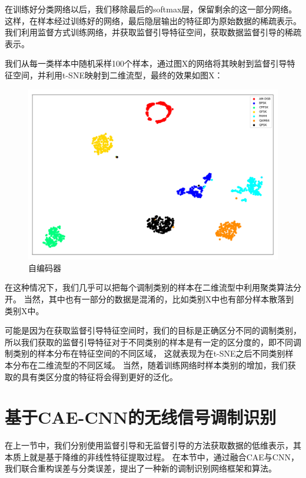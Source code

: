 在训练好分类网络以后，我们移除最后的softmax层，保留剩余的这一部分网络。
这样，在样本经过训练好的网络，最后隐层输出的特征即为原始数据的稀疏表示。
我们利用监督方式训练网络，并获取监督引导特征空间，获取数据监督引导的稀疏表示。\par
我们从每一类样本中随机采样100个样本，通过图X的网络将其映射到监督引导特征空间，并利用t-SNE映射到二维流型，最终的效果如图X：
\begin{figure}[!h]
	\centering
	\includegraphics[scale=0.4]{figures/chapter_3/fig_3_7}
	\caption{自编码器}	\label{sec:fig_3_7}
\end{figure}

在这种情况下，我们几乎可以把每个调制类别的样本在二维流型中利用聚类算法分开。
当然，其中也有一部分的数据是混淆的，比如类别X中也有部分样本散落到类别X中。\par
可能是因为在获取监督引导特征空间时，我们的目标是正确区分不同的调制类别，
所以我们获取的监督引导特征对于不同类别的样本是有一定的区分度的，即不同调制类别的样本分布在特征空间的不同区域，
这就表现为在t-SNE之后不同类别样本分布在二维流型的不同区域。
当然，随着训练网络时样本类别的增加，我们获取的具有类区分度的特征将会得到更好的泛化。\par


\section{基于CAE-CNN的无线信号调制识别}

在上一节中，我们分别使用监督引导和无监督引导的方法获取数据的低维表示，其本质上就是基于降维的非线性特征提取过程。
在本节中，通过融合CAE与CNN，我们联合重构误差与分类误差，提出了一种新的调制识别网络框架和算法。

